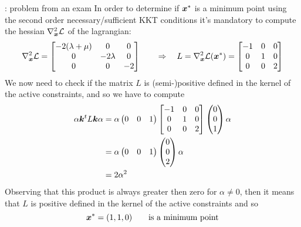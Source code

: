 \begin{example}{: problem from an exam}
		In order to determine if $\boldsymbol{x}^*$ is a minimum point using the second order necessary/sufficient KKT conditions it's mandatory to compute the hessian $\nabla^2_{\boldsymbol{x}} \mathcal L$ of the lagrangian:
		\[ \nabla^2_{\boldsymbol{x}} \mathcal L = \begin{bmatrix}
			-2(\lambda+\mu) & 0 & 0 \\ 0 & -2\lambda & 0 \\ 0 & 0 & - 2
		\end{bmatrix} \qquad \Rightarrow \quad L = \nabla^2_{\boldsymbol{x}} \mathcal L(\boldsymbol{x}^*) = \begin{bmatrix}
			-1 & 0 & 0 \\ 0 & 1 & 0 \\ 0 & 0 & 2
		\end{bmatrix}  \]
		We now need to check if the matrix $L$ is (semi-)positive defined in the kernel of the active constraints, and so we have to compute
		\begin{align*}
			\alpha\boldsymbol{k}^t L \boldsymbol{k} \alpha & = \alpha \begin{pmatrix} 0 & 0 & 1 \end{pmatrix} \begin{bmatrix}
				-1 & 0 & 0 \\ 0 & 1 & 0 \\ 0 & 0 & 2
			\end{bmatrix} \begin{pmatrix}  0 \\0 \\ 1  \end{pmatrix} \alpha \\
		 	& = \alpha \begin{pmatrix} 0 & 0 & 1 \end{pmatrix} \begin{pmatrix} 0 \\ 0 \\ 2 \end{pmatrix} \alpha \\
		 	& = 2\alpha^2
		\end{align*}
		Observing that this product is always greater then zero for $\alpha \neq 0$, then it means that $L$ is positive defined in the kernel of the active constraints and so
		\[ \boldsymbol{x}^* = (1,1,0) \qquad \textrm{is a minimum point} \]	
	\end{example}
	
	
	
	
	
	
	
	
	
	
	
	
	
	
	
	
	
	
	
	
	
	
	
	
	
	
	
	
	
	
	
	
	
	
	
	
	
	
	
	